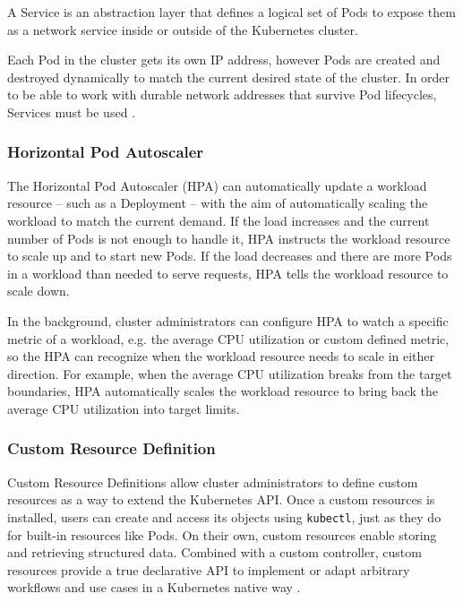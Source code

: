 A Service is an abstraction layer that defines a logical set of Pods to expose them as a network service inside or outside of the Kubernetes cluster.

Each Pod in the cluster gets its own IP address, however Pods are created and destroyed dynamically to match the current desired state of the cluster. In order to be able to work with durable network addresses that survive Pod lifecycles, Services must be used \cite{KubernetesService}.


\subsubsection{Horizontal Pod Autoscaler}

The Horizontal Pod Autoscaler (HPA) can automatically update a workload resource -- such as a Deployment -- with the aim of automatically scaling the workload to match the current demand. If the load increases and the current number of Pods is not enough to handle it, HPA instructs the workload resource to scale up and to start new Pods. If the load decreases and there are more Pods in a workload than needed to serve requests, HPA tells the workload resource to scale down.

In the background, cluster administrators can configure HPA to watch a specific metric of a workload, e.g. the average CPU utilization or custom defined metric, so the HPA can recognize when the workload resource needs to scale in either direction. For example, when the average CPU utilization breaks from the target boundaries, HPA automatically scales the workload resource to bring back the average CPU utilization into target limits.

\subsubsection{Custom Resource Definition}

Custom Resource Definitions allow cluster administrators to define custom resources as a way to extend the Kubernetes API. Once a custom resources is installed, users can create and access its objects using \texttt{kubectl}, just as they do for built-in resources like Pods. On their own, custom resources enable storing and retrieving structured data. Combined with a custom controller, custom resources provide a true declarative API to implement or adapt arbitrary workflows and use cases in a Kubernetes native way \cite{KubernetesCRD}.

